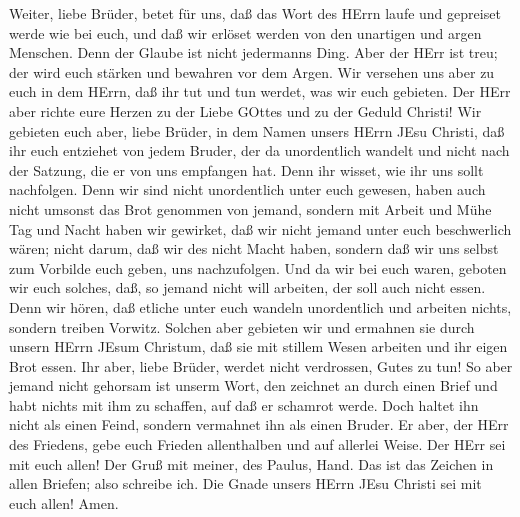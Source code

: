  Weiter, liebe Brüder, betet für uns, daß das Wort des HErrn
laufe und gepreiset werde wie bei euch,  und daß wir erlöset
werden von den unartigen und argen Menschen. Denn der Glaube ist nicht
jedermanns Ding.  Aber der HErr ist treu; der wird euch
stärken und bewahren vor dem Argen.  Wir versehen uns aber
zu euch in dem HErrn, daß ihr tut und tun werdet, was wir euch gebieten.
 Der HErr aber richte eure Herzen zu der Liebe GOttes und zu
der Geduld Christi!  Wir gebieten euch aber, liebe Brüder,
in dem Namen unsers HErrn JEsu Christi, daß ihr euch entziehet von jedem
Bruder, der da unordentlich wandelt und nicht nach der Satzung, die er
von uns empfangen hat.  Denn ihr wisset, wie ihr uns sollt
nachfolgen. Denn wir sind nicht unordentlich unter euch gewesen,
 haben auch nicht umsonst das Brot genommen von jemand,
sondern mit Arbeit und Mühe Tag und Nacht haben wir gewirket, daß wir
nicht jemand unter euch beschwerlich wären;  nicht darum,
daß wir des nicht Macht haben, sondern daß wir uns selbst zum Vorbilde
euch geben, uns nachzufolgen.  Und da wir bei euch waren,
geboten wir euch solches, daß, so jemand nicht will arbeiten, der soll
auch nicht essen.  Denn wir hören, daß etliche unter euch
wandeln unordentlich und arbeiten nichts, sondern treiben Vorwitz.
 Solchen aber gebieten wir und ermahnen sie durch unsern
HErrn JEsum Christum, daß sie mit stillem Wesen arbeiten und ihr eigen
Brot essen.  Ihr aber, liebe Brüder, werdet nicht
verdrossen, Gutes zu tun!  So aber jemand nicht gehorsam
ist unserm Wort, den zeichnet an durch einen Brief und habt nichts mit
ihm zu schaffen, auf daß er schamrot werde.  Doch haltet
ihn nicht als einen Feind, sondern vermahnet ihn als einen Bruder.
 Er aber, der HErr des Friedens, gebe euch Frieden
allenthalben und auf allerlei Weise. Der HErr sei mit euch allen!
 Der Gruß mit meiner, des Paulus, Hand. Das ist das Zeichen
in allen Briefen; also schreibe ich.  Die Gnade unsers
HErrn JEsu Christi sei mit euch allen! Amen.
